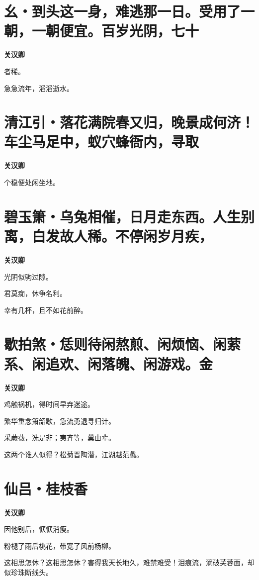 \documentclass[12pt,a4paper]{ctexbook}
\begin{document}
\section{幺・到头这一身，难逃那一日。受用了一朝，一朝便宜。百岁光阴，七十}
\textbf{关汉卿}\par\vspace{0.5em}
者稀。\par
急急流年，滔滔逝水。\par

\section{清江引・落花满院春又归，晚景成何济！车尘马足中，蚁穴蜂衙内，寻取}
\textbf{关汉卿}\par\vspace{0.5em}
个稳便处闲坐地。\par

\section{碧玉箫・乌兔相催，日月走东西。人生别离，白发故人稀。不停闲岁月疾，}
\textbf{关汉卿}\par\vspace{0.5em}
光阴似驹过隙。\par
君莫痴，休争名利。\par
幸有几杯，且不如花前醉。\par

\section{歇拍煞・恁则待闲熬煎、闲烦恼、闲萦系、闲追欢、闲落魄、闲游戏。金}
\textbf{关汉卿}\par\vspace{0.5em}
鸡触祸机，得时间早弃迷途。\par
繁华重念箫韶歇，急流勇退寻归计。\par
采蕨薇，洗是非；夷齐等，巢由辈。\par
这两个谁人似得？松菊晋陶潜，江湖越范蠡。\par

\section{仙吕・桂枝香}
\textbf{关汉卿}\par\vspace{0.5em}
因他别后，恹恹消瘦。\par
粉褪了雨后桃花，带宽了风前杨柳。\par
这相思怎休？这相思怎休？害得我天长地久，难禁难受！泪痕流，滴破芙蓉面，却似珍珠断线头。\par
\end{document}
